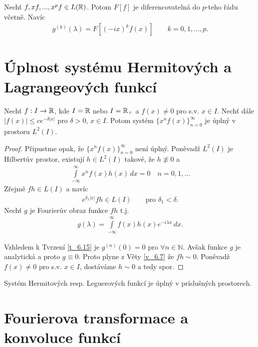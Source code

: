 \begin{tvrz}
\label{t_6.15}
Nechť $f, xf, ... , x^pf \in L(\mathbb{R})$. Potom $F[f]$ je diferencovatelná do $p$-teho řádu včetně. Navíc
\begin{align*}
g^{(k)}(\lambda)=F[(-ix)^kf(x)] \qquad k=0,1,...,p.
\end{align*}

\end{tvrz}

\section{Úplnost systému Hermitových a Lagrangeových funkcí}

\begin{theorem}
Nechť $f:I\to\mathbb{R}$, kde $I=\mathbb{R}$ nebo $I=\mathbb{R}_+$ a $f(x) \neq 0$ pro s.v. $x \in I$. Nechť dále $|f(x)|\leq c e^{-\delta|x|}$ pro $\delta>0$, $x \in I$. Potom systém $\{x^nf(x)\}_{n=0}^{\infty}$ je úplný v prostoru $L^2(I)$.
\end{theorem}

\begin{proof}
Připustme opak, že $\{x^nf(x)\}_{n=0}^{\infty}$ není úplný. Poněvadž $L^2(I)$ je Hilbert\r uv prostor, existují $h \in L^2(I)$ takové, že $h \not\equiv 0$ a 
\begin{align*}
\int \limits _{-\infty}^{\infty}x^nf(x)h(x)\, dx = 0 \quad n=0,1,...
\end{align*}
Zřejmě $fh \in L(I)$ a navíc
\begin{align*}
e^{\delta_1|x|}fh \in L(I) \qquad \text{pro $\delta_1<\delta$}.
\end{align*}
Nechť $g$ je Fourier\r uv obraz funkce $fh$ t.j. 
\begin{align*}
g(\lambda)=\int \limits _{-\infty}^{\infty} f(x)h(x)e^{-i\lambda x}\, dx.
\end{align*}

Vzhledem k Tvrzení \ref{t_6.15} je $g^{(n)}(0)=0$ pro $\forall n \in \mathbb{N}$. 
Avšak funkce $g$ je analytická a proto $g \equiv 0$. 
Proto plyne z Věty \ref{v_6.7} že $fh \sim 0$. 
Poněvadž $f(x) \neq 0$ pro s.v. $x \in I$, dostáváme $h \sim 0$ a tedy spor.
\end{proof}

\begin{tvrz}
Systém Hermitových resp. Leguerových funkcí je úplný v príslušných prostorech.
\end{tvrz}

\section{Fourierova transformace a konvoluce funkcí}

